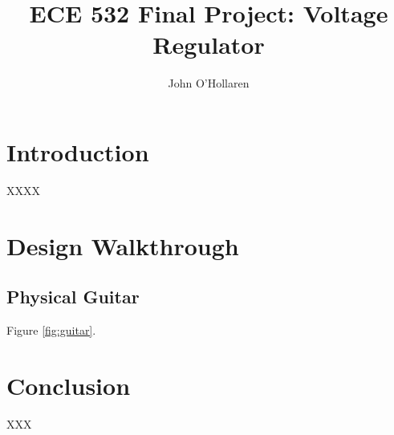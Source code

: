 \documentclass[10pt]{amsart}
\title{ECE 532 Final Project: Voltage Regulator}
\author{John O'Hollaren}
\begin{document}
\maketitle

\section{Introduction}
XXXX

\section{Design Walkthrough}
\subsection{Physical Guitar}
Figure \ref{fig:guitar}.


\section{Conclusion}
XXX
\end{document}

